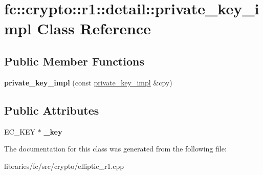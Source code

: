 \hypertarget{classfc_1_1crypto_1_1r1_1_1detail_1_1private__key__impl}{}\section{fc\+:\+:crypto\+:\+:r1\+:\+:detail\+:\+:private\+\_\+key\+\_\+impl Class Reference}
\label{classfc_1_1crypto_1_1r1_1_1detail_1_1private__key__impl}
\subsection*{Public Member Functions}
\begin{DoxyCompactItemize}
\item 
\mbox{\label{classfc_1_1crypto_1_1r1_1_1detail_1_1private__key__impl_a8749ec686a527d3e6355ba67df7d0b9a}} 
{\bfseries private\+\_\+key\+\_\+impl} (const \mbox{\hyperlink{classfc_1_1crypto_1_1r1_1_1detail_1_1private__key__impl}{private\+\_\+key\+\_\+impl}} \&cpy)
\end{DoxyCompactItemize}
\subsection*{Public Attributes}
\begin{DoxyCompactItemize}
\item 
\mbox{\label{classfc_1_1crypto_1_1r1_1_1detail_1_1private__key__impl_a546d2e6177cd1435c6ba5ae13e32f5cb}} 
E\+C\+\_\+\+K\+EY $\ast$ {\bfseries \+\_\+key}
\end{DoxyCompactItemize}


The documentation for this class was generated from the following file\+:\begin{DoxyCompactItemize}
\item 
libraries/fc/src/crypto/elliptic\+\_\+r1.\+cpp\end{DoxyCompactItemize}
